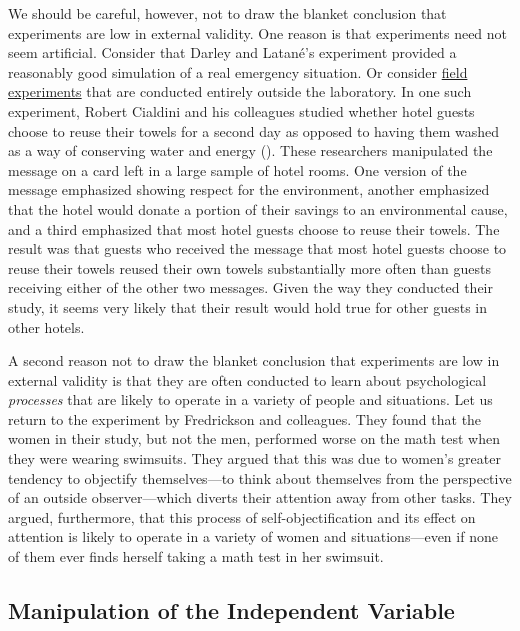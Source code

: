 \documentclass[
]{krantz}
\begin{document}
We should be careful, however, not to draw the blanket conclusion that experiments are low in external validity. One reason is that experiments need not seem artificial. Consider that Darley and Latané's experiment provided a reasonably good simulation of a real emergency situation. Or consider \hyperref[field-experiments]{field experiments} that are conducted entirely outside the laboratory. In one such experiment, Robert Cialdini and his colleagues studied whether hotel guests choose to reuse their towels for a second day as opposed to having them washed as a way of conserving water and energy (). These researchers manipulated the message on a card left in a large sample of hotel rooms. One version of the message emphasized showing respect for the environment, another emphasized that the hotel would donate a portion of their savings to an environmental cause, and a third emphasized that most hotel guests choose to reuse their towels. The result was that guests who received the message that most hotel guests choose to reuse their towels reused their own towels substantially more often than guests receiving either of the other two messages. Given the way they conducted their study, it seems very likely that their result would hold true for other guests in other hotels.

A second reason not to draw the blanket conclusion that experiments are low in external validity is that they are often conducted to learn about psychological \emph{processes} that are likely to operate in a variety of people and situations. Let us return to the experiment by Fredrickson and colleagues. They found that the women in their study, but not the men, performed worse on the math test when they were wearing swimsuits. They argued that this was due to women's greater tendency to objectify themselves---to think about themselves from the perspective of an outside observer---which diverts their attention away from other tasks. They argued, furthermore, that this process of self-objectification and its effect on attention is likely to operate in a variety of women and situations---even if none of them ever finds herself taking a math test in her swimsuit.

\subsection*{Manipulation of the Independent Variable}\label{manipulation-of-the-independent-variable}
\end{document}

